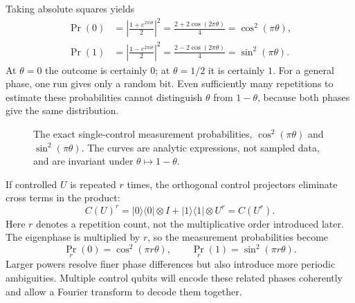 \documentclass[11pt,oneside,openany]{book}
\newcommand{\ketbra}[2]{\lvert #1\rangle\langle #2\rvert}
\newcommand{\ii}{\mathrm{i}}
\theoremstyle{definition}
\begin{document}
Taking absolute squares yields
\begin{align}
 \Pr(0)&=\left|\frac{1+e^{2\pi\ii\theta}}{2}\right|^2
 =\frac{2+2\cos(2\pi\theta)}4=\cos^2(\pi\theta),\\
 \Pr(1)&=\left|\frac{1-e^{2\pi\ii\theta}}{2}\right|^2
 =\frac{2-2\cos(2\pi\theta)}4=\sin^2(\pi\theta).
 \label{eq:phase:onebitprob}
\end{align}
At $\theta=0$ the outcome is certainly $0$; at $\theta=1/2$ it is certainly $1$. For a general phase, one run gives only a random bit. Even sufficiently many repetitions to estimate these probabilities cannot distinguish $\theta$ from $1-\theta$, because both phases give the same distribution.
\par
\begin{figure}[htbp]
\centering
{}
\caption{The exact single-control measurement probabilities, $\cos^2(\pi\theta)$ and $\sin^2(\pi\theta)$. The curves are analytic expressions, not sampled data, and are invariant under $\theta\mapsto1-\theta$.}
\label{fig:phase:onebitplot}
\end{figure}
\par

If controlled $U$ is repeated $r$ times, the orthogonal control projectors eliminate cross terms in the product:
\begin{equation}
 C(U)^r=\ketbra{0}{0}\otimes I+\ketbra{1}{1}\otimes U^r=C(U^r).
\end{equation}
Here $r$ denotes a repetition count, not the multiplicative order introduced later. The eigenphase is multiplied by $r$, so the measurement probabilities become
\begin{equation}
 \Pr_r(0)=\cos^2(\pi r\theta),\qquad \Pr_r(1)=\sin^2(\pi r\theta).
\end{equation}
Larger powers resolve finer phase differences but also introduce more periodic ambiguities. Multiple control qubits will encode these related phases coherently and allow a Fourier transform to decode them together.
\end{document}
